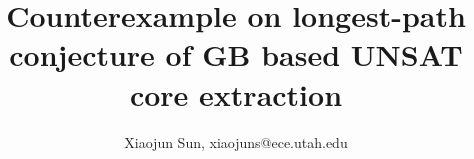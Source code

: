 \documentclass{article}
\begin{document}
\title{Counterexample on longest-path conjecture of GB based UNSAT core extraction}
\author{Xiaojun Sun, xiaojuns@ece.utah.edu}

\maketitle



% 
% 
\end{document}
